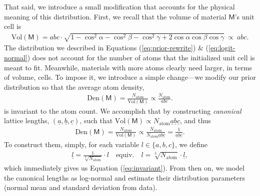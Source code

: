\documentclass{article}
\theoremstyle{plain}
\theoremstyle{definition}
\theoremstyle{remark}
\begin{document}
That said, we introduce a small modification that accounts for the physical meaning of this distribution. 
First, we recall that the volume of material $\mathsf{M}$'s unit cell is
\begin{align}
\label{eq:volume}
\text{Vol}(\mathsf{M})
=
abc \cdot
\sqrt{
1
- \cos^2\alpha
- \cos^2\beta
- \cos^2\gamma
+ 2\cos\alpha\cos\beta\cos\gamma
} \ \propto \ abc.
\end{align}
The distribution we described in Equations (\ref{eq:prior-rewrite}) \& (\ref{eq:logit-normal}) does not account for the number of atoms that the initialized unit cell is meant to fit.
Meanwhile, materials with more atoms clearly need larger, in terms of volume, cells.
To impose it, we introduce a simple change---we modify our prior distribution so that the average atom density,
\begin{align}
    \label{eq:den}
    \text{Den}(\mathsf{M}) = \frac{N_{\text{atom}}}{\text{Vol}(\mathsf{M})}\propto \frac{N_{\text{atom}}}{abc}.
\end{align}
is invariant to the atom count.  
We accomplish that by constructing \emph{canonical} lattice lengths, $(\underline{a}, \underline{b}, \underline{c})$, such that 
$\text{Vol}(\mathsf{M})\propto N_{\text{atom}}\underline{a}\underline{b}\underline{c}$, and thus
\begin{align}
    \label{eq:invariant}
    \text{Den}(\mathsf{M}) = \frac{N_{\text{atom}}}{\text{Vol}(\mathsf{M})}\propto \frac{N_{\text{atom}}}{N_{\text{atom}}\underline{a}\underline{b}\underline{c}} = \frac{1}{\underline{a}\underline{b}\underline{c}}.
\end{align}
To construct them, simply, for each variable $l\in\{a, b, c\}$, we define
\begin{align}
    \underline{l} = \frac{1}{\sqrt[3]{N_{\text{atom}}}} \cdot l \quad \text{equiv.} \quad l = \sqrt[3]{N_{\text{atom}}} \cdot \underline{l}, \nonumber
\end{align}
which immediately gives us Equation (\ref{eq:invariant}).
From then on, we model the canonical lengths as log-normal and estimate their distribution parameters (normal mean and standard deviation from data). 
\end{document}
